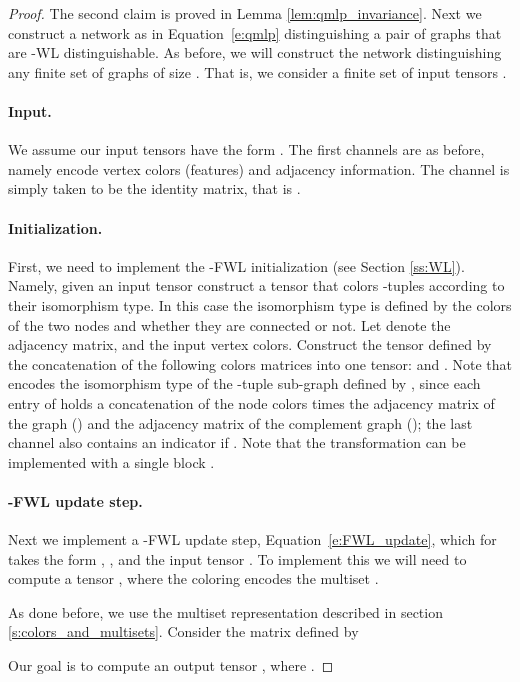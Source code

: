 \documentclass{article}
\def\Eqref#1{Equation~\ref{#1}}
\begin{document}
\begin{proof}
The second claim is proved in Lemma \ref{lem:qmlp_invariance}. Next we construct a network as in \Eqref{e:qmlp} distinguishing a pair of graphs that are -WL distinguishable. As before, we will construct the network distinguishing any finite set of graphs of size . That is, we consider a finite set of input tensors .  

\paragraph{Input.}
We assume our input tensors have the form . The first  channels are as before, namely encode vertex colors (features) and adjacency information. The  channel is simply taken to be the identity matrix, that is .  


\paragraph{Initialization.}
First, we need to implement the -FWL initialization (see Section \ref{ss:WL}). Namely, given an input tensor  construct a tensor that colors -tuples according to their isomorphism type. In this case the isomorphism type is defined by the colors of the two nodes and whether they are connected or not. Let  denote the adjacency matrix, and  the input vertex colors. Construct the tensor  defined by the concatenation of the following colors matrices into one tensor: 
and .
Note that  encodes the isomorphism type of the -tuple sub-graph defined by , since each entry of  holds a concatenation of the node colors times the adjacency matrix of the graph () and the adjacency matrix of the complement graph (); the last channel also contains an indicator if . Note that the transformation  can be implemented with a single block .


\paragraph{-FWL update step.}
Next we implement a -FWL update step, \Eqref{e:FWL_update}, which for  takes the form , , and the input tensor . To implement this we will need to compute a tensor , where the coloring  encodes the multiset . 

As done before, we use the multiset representation described in section \ref{s:colors_and_multisets}. Consider the matrix  defined by

Our goal is to compute an output tensor , where . 


\end{proof}
\end{document}
